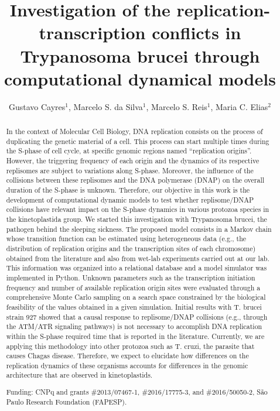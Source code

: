 \documentclass[twoside]{article}
\title{\vspace{-15mm}\fontsize{24pt}{10pt}\selectfont\textbf{Investigation of the replication-transcription conflicts in Trypanosoma brucei  through computational dynamical models}} %
\author{Gustavo Cayres$^1$, Marcelo S. da Silva$^1$, Marcelo S. Reis$^1$, Maria C. Elias$^2$}
\affil{1 INSTITUTO BUTANTAN\\ 2 LECC-CETICS, BUTANTAN INSTITUTE\\ }
\date{}
\begin{document}
\maketitle %

\thispagestyle{fancy} %


\begin{abstract}
In the context of Molecular Cell Biology, DNA replication consists on the process of duplicating the genetic material of a cell. This process can start multiple times during the S-phase of cell cycle, at specific genomic regions named ``replication origins''. However, the triggering frequency of each origin and the dynamics of its respective replisomes are subject to variations along S-phase. Moreover, the influence of the collisions between these replisomes and the DNA polymerase (DNAP) on the overall duration of the S-phase is unknown.
Therefore, our objective in this work is the development of computational dynamic models to test whether replisome/DNAP collisions have relevant impact on the S-phase dynamics in various protozoa species in the kinetoplastida group. We started this investigation with Trypanosoma brucei, the pathogen behind the sleeping sickness.
The proposed model consists in a Markov chain whose transition function can be estimated using heterogeneous data (e.g., the distribution of replication origins and the transcription sites of each chromosome) obtained from the literature and also from wet-lab experiments carried out at our lab. This information was organized into a relational database and a model simulator was implemented in Python. Unknown parameters such as the transcription initiation frequency and number of
available replication origin sites were evaluated through a comprehensive Monte Carlo sampling on a search space constrained by the biological feasibility of the values obtained in a given simulation.
Initial results with T. brucei strain 927 showed that a causal response to replisome/DNAP collisions (e.g., through the ATM/ATR signaling pathways) is not necessary to accomplish DNA replication within the S-phase required time that is reported in the literature. Currently, we are applying this methodology into other protozoa such as T. cruzi, the parasite that causes Chagas disease. Therefore, we expect to elucidate how differences on the replication dynamics of these organisms accounts for differences in the genomic architecture that are observed in kinetoplastids.

Funding: CNPq and grants \#2013/07467-1, \#2016/17775-3, and \#2016/50050-2, S\~ao Paulo Research Foundation (FAPESP).
\end{abstract}
\end{document}

